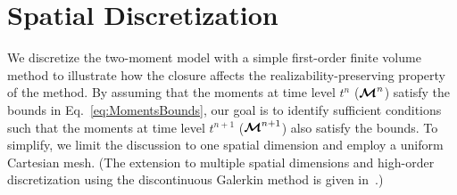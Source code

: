 \section{Spatial Discretization}\label{se:SpatialDiscretization}

We discretize the two-moment model with a simple first-order finite volume method to illustrate how the closure affects the realizability-preserving property of the method.  
By assuming that the moments at time level $t^{n}$ ($\boldsymbol{\mathcal{M}}^{n}$) satisfy the bounds in Eq.~\eqref{eq:MomentsBounds}, our goal is to identify sufficient conditions such that the moments at time level $t^{n+1}$ ($\boldsymbol{\mathcal{M}}^{n+1}$) also satisfy the bounds.
To simplify, we limit the discussion to one spatial dimension and employ a uniform Cartesian mesh.  
(The extension to multiple spatial dimensions and high-order discretization using the discontinuous Galerkin method is given in~\cite{chu_etal_2018}.)

